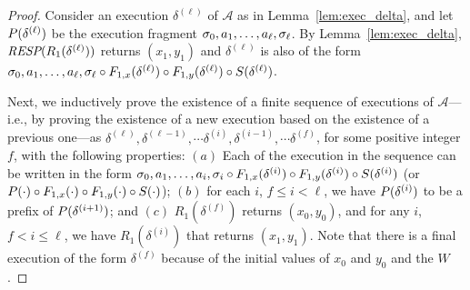 \begin{proof}
\sloppy Consider an execution $\delta^{(\ell)}$  of $\mathcal{A}$ as in Lemma~\ref{lem:exec_delta}, and let $\prefix{\delta^{(\ell)}}$  be the execution fragment
$\finiteprefix{\ell-1}{\ell}$.
By  Lemma~\ref{lem:exec_delta}, $\RESP{R_1(\delta^{(\ell)})}$  returns
 $(x_1, y_1)$ and $\delta^{(\ell)}$ is also of the form    
$\finiteprefix{\ell-1}{\ell} \circ \frag{1,x}{\delta^{(\ell)}} \circ \frag{1,y}{\delta^{(\ell)}} \circ \suffix{\delta^{(\ell)}}$.     

Next, we inductively prove the existence of a finite sequence of executions of $\mathcal{A}$---i.e., by proving the existence of a new execution based on the existence of a previous one---as $\delta^{(\ell)}, \delta^{(\ell-1)}, \cdots \delta^{(i)}, \delta^{(i-1)},  \cdots \delta^{(f)}$, 
for some positive integer $f$, with the following properties: $(a)$ Each of the execution in 
the sequence can be written in the form  $\finiteprefix{i-1}{i} \circ \frag{1,x}{\delta^{(i)}} \circ \frag{1,y}{\delta^{(i)}} \circ \suffix{\delta^{(i)}}$ (or $\prefix{\cdot}\circ \frag{1,x}{\cdot}\circ \frag{1,y}{\cdot}\circ\suffix{\cdot}$); $(b)$ for each $i$, $f \leq i  < \ell$, we have  $\prefix{\delta^{(i)}}$ to be a prefix of $\prefix{\delta^{(i+1)}}$; and $(c)$ $R_1(\delta^{(f)})$  returns  $(x_0, y_0)$, and for any $i$,  $f <  i \leq \ell$,  we have   $R_1(\delta^{(i)})$  that returns  $(x_1, y_1)$.  Note that there is a final execution of the form $\delta^{(f)}$  because of the initial values of $x_0$ and $y_0$  and the \wot{}  $W$. 



 

\end{proof}
